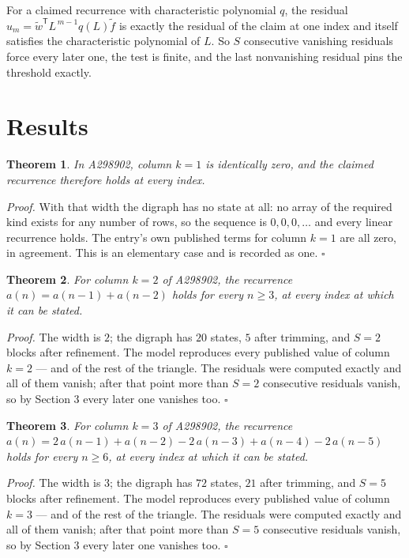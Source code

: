 \documentclass[11pt]{article}
\newtheorem{theorem}{Theorem}
\theoremstyle{definition}
\begin{document}
For a claimed recurrence with characteristic polynomial $q$, the residual $u_m = \tilde w^{\mathsf T}L^{\,m-1}q(L)\tilde f$ is exactly the residual of the claim at one index and itself satisfies the characteristic polynomial of $L$. So $S$ consecutive vanishing residuals force every later one, the test is finite, and the last nonvanishing residual pins the threshold exactly.

\section{Results}

\begin{theorem} In A298902, column $k = 1$ is identically zero, and the claimed recurrence therefore holds at every index.\end{theorem}

{\itshape Proof.} With that width the digraph has no state at all: no array of the required kind exists for any number of rows, so the sequence is $0,0,0,\dots$ and every linear recurrence holds. The entry's own published terms for column $k = 1$ are all zero, in agreement. This is an elementary case and is recorded as one. $\square$

\begin{theorem} For column $k = 2$ of A298902, the recurrence $a(n) = a(n-1) + a(n-2)$ holds for every $n \ge 3$, at every index at which it can be stated.\end{theorem}

{\itshape Proof.} The width is $2$; the digraph has $20$ states, $5$ after trimming, and $S = 2$ blocks after refinement. The model reproduces every published value of column $k = 2$ --- and of the rest of the triangle. The residuals were computed exactly and all of them vanish; after that point more than $S = 2$ consecutive residuals vanish, so by Section 3 every later one vanishes too. $\square$

\begin{theorem} For column $k = 3$ of A298902, the recurrence $a(n) = 2\,a(n-1) + a(n-2) - 2\,a(n-3) + a(n-4) - 2\,a(n-5)$ holds for every $n \ge 6$, at every index at which it can be stated.\end{theorem}

{\itshape Proof.} The width is $3$; the digraph has $72$ states, $21$ after trimming, and $S = 5$ blocks after refinement. The model reproduces every published value of column $k = 3$ --- and of the rest of the triangle. The residuals were computed exactly and all of them vanish; after that point more than $S = 5$ consecutive residuals vanish, so by Section 3 every later one vanishes too. $\square$
\end{document}
